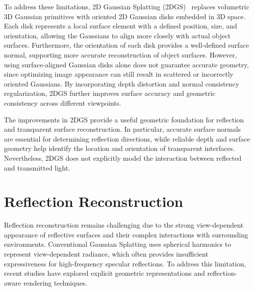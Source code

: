 To address these limitations, 2D Gaussian Splatting (2DGS)~\cite{huang2024} replaces volumetric 3D Gaussian primitives with oriented 2D Gaussian disks embedded in 3D space. Each disk represents a local surface element with a defined position, size, and orientation, allowing the Gaussians to align more closely with actual object surfaces. Furthermore, the orientation of each disk provides a well-defined surface normal, supporting more accurate reconstruction of object surfaces. However, using surface-aligned Gaussian disks alone does not guarantee accurate geometry, since optimizing image appearance can still result in scattered or incorrectly oriented Gaussians. By incorporating depth distortion and normal consistency regularization, 2DGS further improves surface accuracy and geometric consistency across different viewpoints.

The improvements in 2DGS provide a useful geometric foundation for reflection and transparent surface reconstruction. In particular, accurate surface normals are essential for determining reflection directions, while reliable depth and surface geometry help identify the location and orientation of transparent interfaces. Nevertheless, 2DGS does not explicitly model the interaction between reflected and transmitted light.

\section{Reflection Reconstruction}

Reflection reconstruction remains challenging due to the strong view-dependent appearance of reflective surfaces and their complex interactions with surrounding environments. Conventional Gaussian Splatting uses spherical harmonics to represent view-dependent radiance, which often provides insufficient expressiveness for high-frequency specular reflections. To address this limitation, recent studies have explored explicit geometric representations and reflection-aware rendering techniques.

